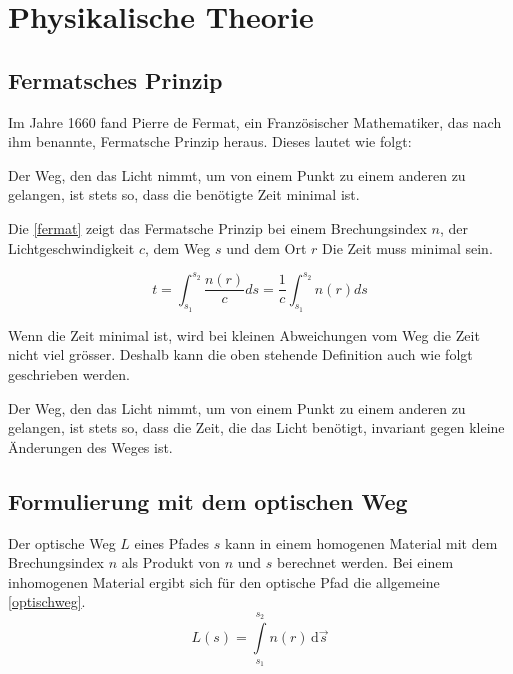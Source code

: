 \section{Physikalische Theorie}

\subsection{Fermatsches Prinzip}
Im Jahre 1660 fand Pierre de Fermat, 
ein Französischer Mathematiker, das 
nach ihm benannte, Fermatsche Prinzip heraus. 
Dieses lautet wie folgt\cite{Definition}:

\begin{definition}
	Der Weg, den das Licht nimmt, 
	um von einem Punkt zu einem anderen zu gelangen, 
	ist stets so, dass die benötigte Zeit minimal ist.
\end{definition}

Die \eqref{fermat} zeigt das Fermatsche Prinzip bei einem Brechungsindex $n$, 
der Lichtgeschwindigkeit $c$, dem Weg $s$ und dem Ort $r$ Die Zeit muss minimal sein.

\begin{equation}
	t= \int_{s_1}^{s_2} \frac{n(r)}{c} ds = \frac{1}{c} \int_{s_1}^{s_2} n(r) ds
	\label{fermat}
\end{equation}


Wenn die Zeit minimal ist, wird bei kleinen Abweichungen vom Weg die Zeit nicht viel grösser. 
Deshalb kann die oben stehende Definition auch wie folgt geschrieben werden\cite{Definition}.

\begin{definition}
	Der Weg, den das Licht nimmt, 
	um von einem Punkt zu einem anderen zu gelangen, 
	ist stets so, dass die Zeit, die das Licht benötigt, 
	invariant gegen kleine Änderungen des Weges ist.
\end{definition}

\subsection{Formulierung mit dem optischen Weg}
Der optische Weg $L$  eines Pfades $s$ kann in einem homogenen Material 
mit dem Brechungsindex $n$ als Produkt von $n$ und $s$ berechnet werden.
Bei einem inhomogenen Material ergibt sich für den optische Pfad die allgemeine \eqref{optischweg}.
\begin{equation}
	L(s) = \int\limits_{s_1}^{s_2} n(r) \,\mathrm d\vec s 
	\label{optischweg}
\end{equation}

